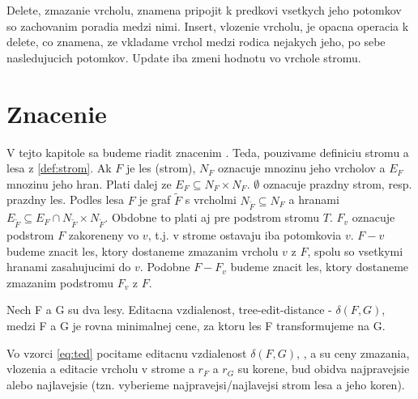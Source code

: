 Delete, zmazanie vrcholu, znamena pripojit k predkovi vsetkych jeho potomkov so
zachovanim poradia medzi nimi. Insert, vlozenie vrcholu, je opacna operacia k
delete, co znamena, ze vkladame vrchol medzi rodica nejakych jeho, po sebe
nasledujucich potomkov. Update iba zmeni hodnotu vo vrchole stromu.

\section{Znacenie}

V tejto kapitole sa budeme riadit znacenim \citet{RTED}. Teda, pouzivame definiciu
stromu a lesa z \ref{def:strom}. Ak $F$ je les (strom), $N_F$ oznacuje mnozinu jeho vrcholov a $E_F$
mnozinu jeho hran. Plati dalej ze $E_F \subseteq N_F \times N_F$. $\emptyset$ oznacuje
prazdny strom, resp. prazdny les. Podles lesa $F$ je graf $\tilde{F}$ s vrcholmi
$N_{\tilde{F}} \subseteq N_F$ a hranami $E_{\tilde{F}} \subseteq E_F \cap N_{\tilde{F}} \times N_{\tilde{F}}$.
Obdobne to plati aj pre podstrom stromu $T$.
$F_{v}$ oznacuje podstrom $F$ zakoreneny vo $v$, t.j. v strome ostavaju iba potomkovia $v$.
$F - v$ budeme znacit les, ktory dostaneme zmazanim vrcholu $v$ z $F$, spolu so vsetkymi hranami
zasahujucimi do $v$. Podobne $F - F_{v}$ budeme znacit les, ktory dostaneme zmazanim podstromu
$F_{v}$ z $F$.

\begin{definice}
	Nech F a G su dva lesy. Editacna vzdialenost, tree-edit-distance - $\delta(F, G)$,
	medzi F a G je rovna minimalnej cene, za ktoru les F transformujeme na G.
\end{definice}

Vo vzorci \ref{eq:ted} pocitame editacnu vzdialenost $\delta(F, G)$,
\Cdel, \Cins a \Cupd su ceny zmazania, vlozenia a editacie vrcholu v strome
a $r_{F}$ a $r_{G}$ su korene, bud obidva najpravejsie alebo najlavejsie (tzn. vyberieme
najpravejsi/najlavejsi strom lesa a jeho koren).

